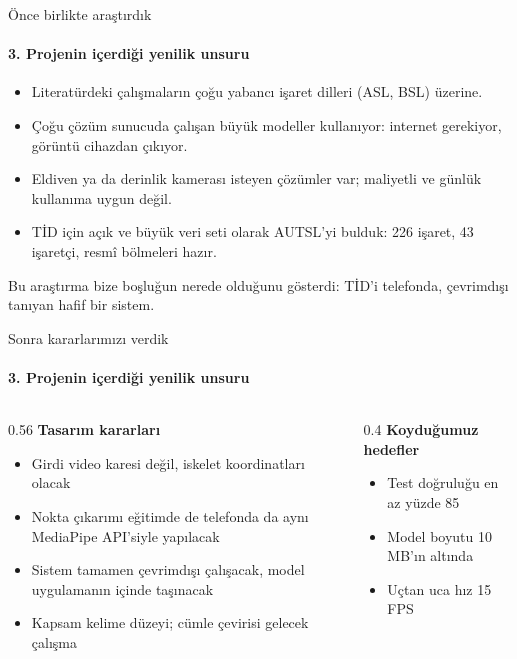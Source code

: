 \documentclass[aspectratio=169,11pt]{beamer}
\begin{document}
\begin{frame}{Önce birlikte araştırdık}
\framesubtitle{3. Projenin içerdiği yenilik unsuru}
\begin{itemize}
\item Literatürdeki çalışmaların çoğu yabancı işaret dilleri (ASL, BSL) üzerine.
\item Çoğu çözüm sunucuda çalışan büyük modeller kullanıyor: internet gerekiyor, görüntü cihazdan çıkıyor.
\item Eldiven ya da derinlik kamerası isteyen çözümler var; maliyetli ve günlük kullanıma uygun değil.
\item TİD için açık ve büyük veri seti olarak AUTSL'yi bulduk: 226 işaret, 43 işaretçi, resmî bölmeleri hazır.
\end{itemize}

\vspace{3mm}
Bu araştırma bize boşluğun nerede olduğunu gösterdi: TİD'i telefonda, çevrimdışı tanıyan hafif bir sistem.
\end{frame}

\begin{frame}{Sonra kararlarımızı verdik}
\framesubtitle{3. Projenin içerdiği yenilik unsuru}
\begin{columns}[T]
\begin{column}{0.56\textwidth}
\textbf{Tasarım kararları}
\begin{itemize}
\item Girdi video karesi değil, iskelet koordinatları olacak
\item Nokta çıkarımı eğitimde de telefonda da aynı MediaPipe API'siyle yapılacak
\item Sistem tamamen çevrimdışı çalışacak, model uygulamanın içinde taşınacak
\item Kapsam kelime düzeyi; cümle çevirisi gelecek çalışma
\end{itemize}
\end{column}
\begin{column}{0.4\textwidth}
\textbf{Koyduğumuz hedefler}
\begin{itemize}
\item Test doğruluğu en az yüzde 85
\item Model boyutu 10 MB'ın altında
\item Uçtan uca hız 15 FPS
\end{itemize}
\end{column}
\end{columns}
\end{frame}
\end{document}
